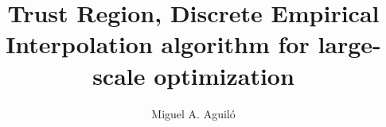 \documentclass[a4paper,12pt,twoside]{report}
\begin{document}
\title{\LARGE {\bf Trust Region, Discrete Empirical Interpolation algorithm for large-scale optimization}\\
 \vspace*{6mm}
}

\author{Miguel A. Aguil\'o}

\normallinespacing
\maketitle

\preface


\body







\appendix




\end{document}
